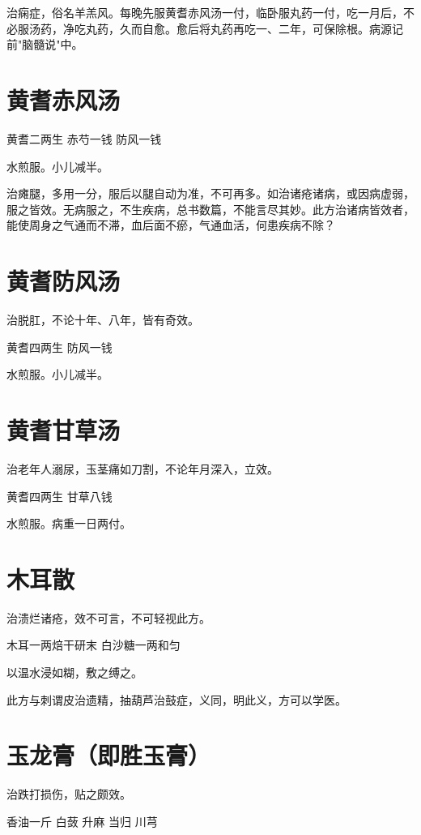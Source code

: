 \documentclass[a4paper,12pt,UTF8,twoside]{ctexbook}
\begin{document}
	治痫症，俗名羊羔风。每晚先服黄耆赤风汤一付，临卧服丸药一付，吃一月后，不必服汤药，净吃丸药，久而自愈。愈后将丸药再吃一、二年，可保除根。病源记前"脑髓说"中。
	
	\section{黄耆赤风汤}
	
	
	黄耆二两生 赤芍一钱 防风一钱
	
	水煎服。小儿减半。
	
	治瘫腿，多用一分，服后以腿自动为准，不可再多。如治诸疮诸病，或因病虚弱，服之皆效。无病服之，不生疾病，总书数篇，不能言尽其妙。此方治诸病皆效者，能使周身之气通而不滞，血后面不瘀，气通血活，何患疾病不除？
	
	\section{黄耆防风汤}
	
	
	治脱肛，不论十年、八年，皆有奇效。
	
	黄耆四两生 防风一钱
	
	水煎服。小儿减半。
	
	\section{黄耆甘草汤}
	
	
	治老年人溺尿，玉茎痛如刀割，不论年月深入，立效。
	
	黄耆四两生 甘草八钱
	
	水煎服。病重一日两付。
	
	\section{木耳散}
	
	
	治溃烂诸疮，效不可言，不可轻视此方。
	
	木耳一两焙干研末 白沙糖一两和匀
	
	以温水浸如糊，敷之缚之。
	
	此方与刺谓皮治遗精，抽葫芦治鼓症，义同，明此义，方可以学医。
	
	\section{玉龙膏（即胜玉膏）}
	
	
	治跌打损伤，贴之颇效。
	
	香油一斤 白蔹 升麻 当归 川芎
	
\end{document}
